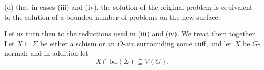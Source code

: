 \hspace*{12pt}(d) that in cases (iii) and (iv), the solution of the original problem is equivalent to the solution of a bounded number of problems on the new surface.

Let us turn then to the reductions used in (iii) and (iv). We treat them together. Let $X \subseteq \Sigma$ be either a schism or an $O$-arc surrounding some cuff, and let $X$ be $G$-normal; and in addition let
\begin{equation*}
X \cap \mathrm{bd}(\Sigma) \subseteq V(G).
\end{equation*}
